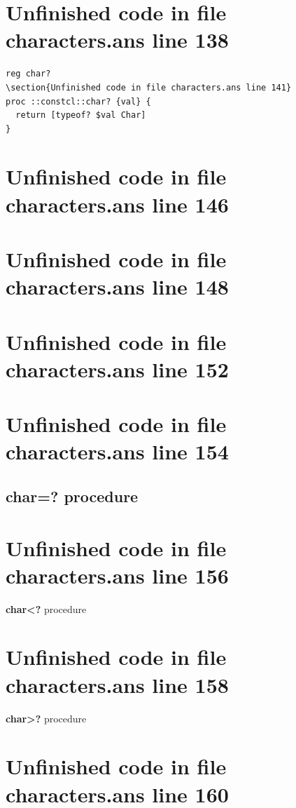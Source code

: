 \documentclass[twoside,9pt]{report}
\begin{document}
\section{Unfinished code in file characters.ans line 138}
\begin{lstlisting}
reg char?
\section{Unfinished code in file characters.ans line 141}
proc ::constcl::char? {val} {
  return [typeof? $val Char]
}
\end{lstlisting}
\section{Unfinished code in file characters.ans line 146}
\section{Unfinished code in file characters.ans line 148}
\section{Unfinished code in file characters.ans line 152}
\section{Unfinished code in file characters.ans line 154}
\subsection{char=? procedure}
\label{char=?-procedure}
\section{Unfinished code in file characters.ans line 156}

\noindent \textbf{char<?} procedure

\section{Unfinished code in file characters.ans line 158}

\noindent \textbf{char>?} procedure

\section{Unfinished code in file characters.ans line 160}
\end{document}
